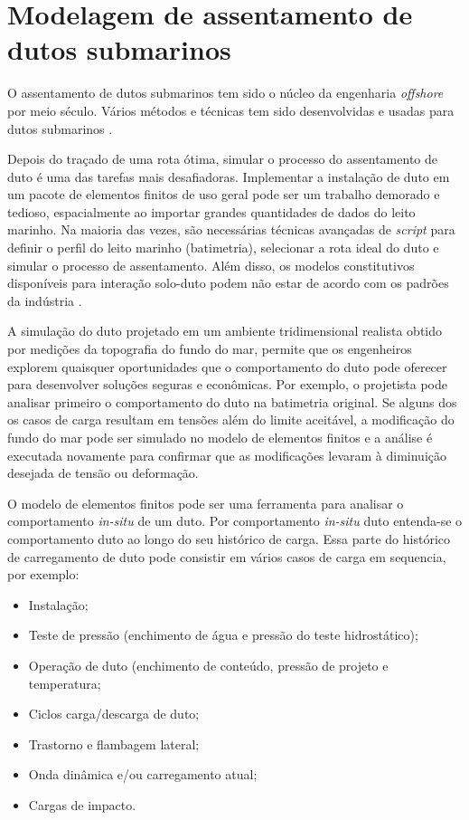 \chapter{Modelagem de assentamento de dutos submarinos}
\label{chap:assentamento}

O assentamento de dutos submarinos tem sido o núcleo da engenharia \textit{offshore} por meio século. Vários métodos e técnicas tem sido desenvolvidas e usadas para dutos submarinos \cite[]{Ivic2016}.

Depois do traçado de uma rota ótima, simular o processo do assentamento de duto é uma das tarefas mais desafiadoras. Implementar a instalação de duto em um pacote de elementos finitos de uso geral pode ser um trabalho demorado e tedioso, espacialmente ao importar grandes quantidades de dados do leito marinho. Na maioria das vezes, são necessárias técnicas avançadas de \textit{script} para definir o perfil do leito marinho (batimetria), selecionar a rota ideal do duto e simular o processo de assentamento. Além disso, os modelos constitutivos disponíveis para interação solo-duto podem não estar de acordo com os padrões da indústria \cite[]{VandenAbeele2013}.

A simulação do duto projetado em um ambiente tridimensional realista obtido por medições da topografia do fundo do mar, permite que os engenheiros explorem quaisquer oportunidades que o comportamento do duto pode oferecer para desenvolver soluções seguras e econômicas. Por exemplo, o projetista pode analisar primeiro o comportamento do duto na batimetria original. Se alguns dos os casos de carga resultam em tensões além do limite aceitável, a modificação do fundo do mar pode ser simulado no modelo de elementos finitos e a análise é executada novamente para confirmar que as modificações levaram à diminuição desejada de tensão ou deformação.

O modelo de elementos finitos pode ser uma ferramenta para analisar o comportamento \textit{in-situ} de um duto. Por comportamento \textit{in-situ} duto entenda-se o comportamento duto ao longo do seu histórico de carga. Essa parte do histórico de carregamento de duto pode consistir em vários casos de carga em sequencia, por exemplo:

\begin{itemize}
    \item Instalação;
    \item Teste de pressão (enchimento de água e pressão do teste hidrostático);
    \item Operação de duto (enchimento de conteúdo, pressão de projeto e temperatura;
    \item Ciclos carga/descarga de duto;
    \item Trastorno e flambagem lateral;
    \item Onda dinâmica e/ou carregamento atual;
    \item Cargas de impacto.
\end{itemize}

